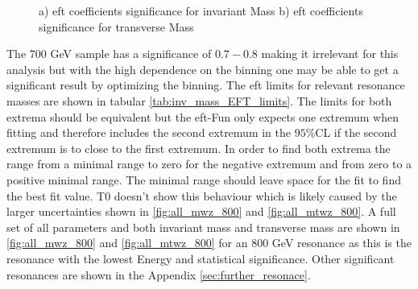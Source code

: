 \documentclass[../Bachelorarbeit.tex]{subfiles}
\begin{document}
\begin{figure}[h]
\begin{subfigure}{0.45\textwidth}
        \caption{}
    \end{subfigure}
    \caption{a) \acrshort{eft} coefficients significance for invariant Mass b) \acrshort{eft} coefficients significance for transverse Mass}
    \label{fig:corss-section-comparission}
\end{figure}

The 700 GeV sample has a significance of $0.7-0.8$ making it irrelevant for this analysis
but with the high dependence on the binning one may be able to get a significant result by optimizing the binning. The \acrshort{eft} limits for relevant resonance masses are shown in tabular \ref{tab:inv_mass_EFT_limits}. The limits for both extrema should be equivalent but the \acrshort{eft}-Fun only expects one extremum when fitting
and therefore includes the second extremum in the $95\%$CL if the second extremum is to close to the first extremum.  In order to find both extrema the range from a minimal range to zero for the negative extremum and from zero to a positive minimal range.
The minimal range should leave space for the fit to find the best fit value. T0 doesn't show this behaviour which is likely caused by the larger uncertainties shown in \ref{fig:all_mwz_800} and \ref{fig:all_mtwz_800}.
A full set of all parameters and both invariant mass and transverse mass are shown in \ref{fig:all_mwz_800} and \ref{fig:all_mtwz_800} for an 800 GeV resonance as this is the resonance with the lowest Energy and statistical significance. Other significant resonances are shown in the Appendix \ref{sec:further_resonace}.
\end{document}
